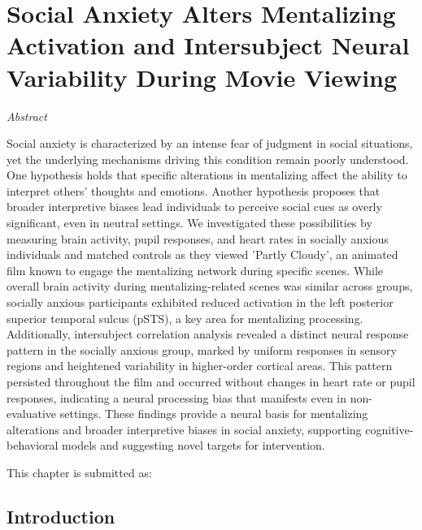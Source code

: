 \chapter{Social Anxiety Alters Mentalizing Activation and Intersubject Neural Variability During Movie Viewing}
\label{ch:mentalizing_sa}

\begin{center}
    \large\textit{Abstract}
\end{center} 

{\abstractfont 
Social anxiety is characterized by an intense fear of judgment in social situations, yet the underlying mechanisms driving this condition remain poorly understood. One hypothesis holds that specific alterations in mentalizing affect the ability to interpret others' thoughts and emotions. Another hypothesis proposes that broader interpretive biases lead individuals to perceive social cues as overly significant, even in neutral settings. We investigated these possibilities by measuring brain activity, pupil responses, and heart rates in socially anxious individuals and matched controls as they viewed 'Partly Cloudy', an animated film known to engage the mentalizing network during specific scenes. While overall brain activity during mentalizing-related scenes was similar across groups, socially anxious participants exhibited reduced activation in the left posterior superior temporal sulcus (pSTS), a key area for mentalizing processing. Additionally, intersubject correlation analysis revealed a distinct neural response pattern in the socially anxious group, marked by uniform responses in sensory regions and heightened variability in higher-order cortical areas. This pattern persisted throughout the film and occurred without changes in heart rate or pupil responses, indicating a neural processing bias that manifests even in non-evaluative settings. These findings provide a neural basis for mentalizing alterations and broader interpretive biases in social anxiety, supporting cognitive-behavioral models and suggesting novel targets for intervention. \par
}  

\vspace*{\fill} 
This chapter is submitted as: 

\thispagestyle{empty}

\newpage

\section{Introduction}

